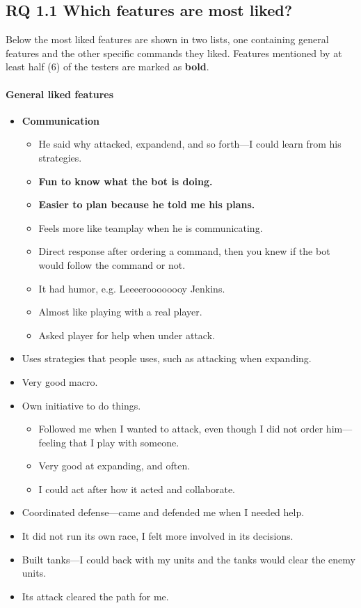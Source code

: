 \subsection{RQ 1.1 Which features are most liked?}
Below the most liked features are shown in two lists, one containing general features and the other specific commands they liked. Features mentioned by at least half (6) of the testers are marked as \textbf{bold}.
\paragraph{General liked features}
\begin{itemize}
	\item \textbf{Communication}
	\begin{itemize}
		\item He said why attacked, expandend, and so forth—I could learn from his strategies.
		\item \textbf{Fun to know what the bot is doing.}
		\item \textbf{Easier to plan because he told me his plans.}
		\item Feels more like teamplay when he is communicating.
		\item Direct response after ordering a command, then you knew if the bot would follow the command or not.
		\item It had humor, e.g. Leeeeroooooooy Jenkins.
		\item Almost like playing with a real player.
		\item Asked player for help when under attack.
	\end{itemize}
	\item Uses strategies that people uses, such as attacking when expanding.
	\item Very good macro.
	\item Own initiative to do things.
	\begin{itemize}
		\item Followed me when I wanted to attack, even though I did not order him—feeling that I play with someone.
		\item Very good at expanding, and often.
		\item I could act after how it acted and collaborate.
	\end{itemize}
	\item Coordinated defense—came and defended me when I needed help.
	\item It did not run its own race, I felt more involved in its decisions.
	\item Built tanks—I could back with my units and the tanks would clear the enemy units.
	\item Its attack cleared the path for me.
\end{itemize}

